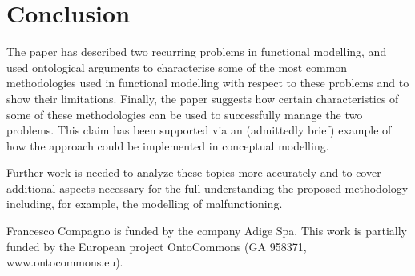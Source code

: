 \documentclass[
]{ceurart}
\begin{document}
\section{Conclusion}
The paper has described two recurring problems in functional modelling, and used ontological arguments to characterise some of the most common methodologies used in functional modelling with respect to these problems and to show their limitations. 
Finally, the paper suggests how certain characteristics of some of these methodologies can be used to successfully manage the two problems. %
This claim has been supported via an (admittedly brief) example of how the approach could be implemented in conceptual modelling.

Further work is needed to analyze these topics more accurately and to cover additional aspects necessary for the full understanding the proposed methodology including, for example, the modelling of malfunctioning.

\acknowledgments

Francesco Compagno is funded by the company Adige Spa. This work is partially funded by the European project
OntoCommons (GA 958371, www.ontocommons.eu).




\end{document}
